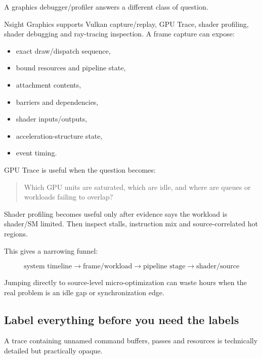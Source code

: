 \hypertarget{05-engine-i-ch008-then-inspect-one-graphics-workload-in-detail}{}

A graphics debugger/profiler answers a different class of question.

Nsight Graphics supports Vulkan capture/replay, GPU Trace, shader profiling, shader debugging and ray-tracing inspection. A frame capture can expose:

\begin{itemize}
\tightlist
\item
  exact draw/dispatch sequence,
\item
  bound resources and pipeline state,
\item
  attachment contents,
\item
  barriers and dependencies,
\item
  shader inputs/outputs,
\item
  acceleration-structure state,
\item
  event timing.
\end{itemize}

GPU Trace is useful when the question becomes:

\begin{quote}
Which GPU units are saturated, which are idle, and where are queues or workloads failing to overlap?
\end{quote}

Shader profiling becomes useful only after evidence says the workload is shader/SM limited. Then inspect stalls, instruction mix and source-correlated hot regions.

This gives a narrowing funnel:

\[
\boxed{
\text{system timeline}
\rightarrow
\text{frame/workload}
\rightarrow
\text{pipeline stage}
\rightarrow
\text{shader/source}
}
\]

Jumping directly to source-level micro-optimization can waste hours when the real problem is an idle gap or synchronization edge.

\subsection{Label everything before you need the labels}\label{05-engine-i-ch008-label-everything-before-you-need-the-labels}

\hypertarget{05-engine-i-ch008-label-everything-before-you-need-the-labels}{}

A trace containing unnamed command buffers, passes and resources is technically detailed but practically opaque.

